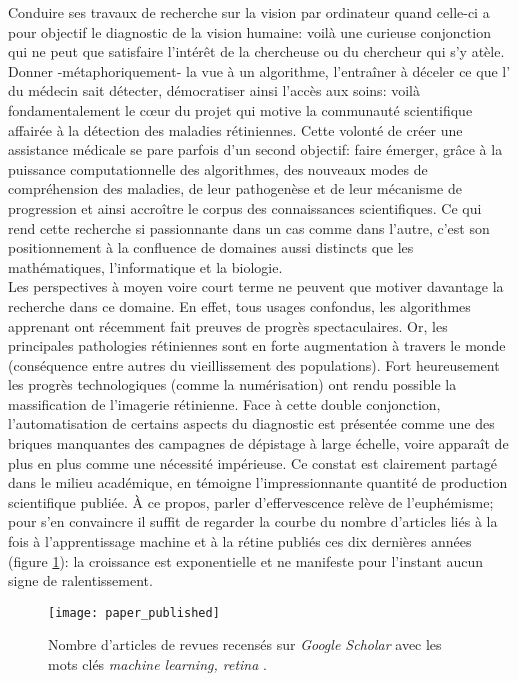 Conduire ses travaux de recherche sur la vision par ordinateur quand celle-ci a pour objectif le diagnostic de la vision humaine: voilà une curieuse conjonction qui ne peut que satisfaire l'intérêt de la chercheuse ou du chercheur qui s'y atèle. Donner -métaphoriquement- la vue à un algorithme, l'entraîner à déceler ce que l'\oeil{} du médecin sait détecter, démocratiser ainsi l'accès aux soins: voilà fondamentalement le cœur du projet qui motive la communauté scientifique affairée à la détection des maladies rétiniennes. Cette volonté de créer une assistance médicale se pare parfois d'un second objectif: faire émerger, grâce à la puissance computationnelle des algorithmes, des nouveaux modes de compréhension des maladies, de leur pathogenèse et de leur mécanisme de progression et ainsi accroître le corpus des connaissances scientifiques. Ce qui rend cette recherche si passionnante dans un cas comme dans l'autre, c'est son positionnement à la confluence de domaines aussi distincts que les mathématiques, l'informatique et la biologie. \\
Les perspectives à moyen voire court terme ne peuvent que motiver davantage la recherche dans ce domaine. En effet, tous usages confondus, les algorithmes \og apprenant \fg ont récemment fait preuves de progrès spectaculaires. Or, les principales pathologies rétiniennes sont en forte augmentation à travers le monde (conséquence entre autres du vieillissement des populations). Fort heureusement les progrès technologiques (comme la numérisation) ont rendu possible la massification de l'imagerie rétinienne. Face à cette double conjonction, l'automatisation de certains aspects du diagnostic est présentée comme une des briques manquantes des campagnes de dépistage à large échelle, voire apparaît de plus en plus comme une nécessité impérieuse. Ce constat est clairement partagé dans le milieu académique, en témoigne l'impressionnante quantité de production scientifique publiée. À ce propos, parler d'effervescence relève de l'euphémisme; pour s'en convaincre il suffit de regarder la courbe du nombre d'articles liés à la fois à l'apprentissage machine et à la rétine publiés ces dix dernières années (figure \ref{fig:articlesPublies}): la croissance est exponentielle et ne manifeste pour l'instant aucun signe de ralentissement.
\begin{figure}[!ht]
	\centering
	\texttt{[image: paper\_published]}
	\caption{Nombre d'articles de revues recensés sur \textit{Google Scholar} avec les mots clés \og \textit{machine learning, retina} \fg.}
	\label{fig:articlesPublies}
\end{figure}



